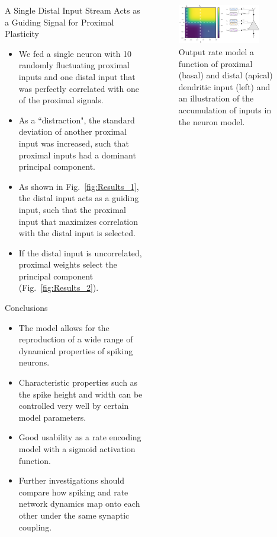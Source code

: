 \documentclass{beamer}
\begin{document}
\begin{frame}[t]
\begin{columns}[t]
\begin{column}{.4\textwidth}
\begin{myblock}{A Single Distal Input Stream Acts as a Guiding Signal for Proximal Plasticity}
\begin{itemize}
\item We fed a single neuron with 10 randomly fluctuating proximal inputs and one distal input that was perfectly correlated with one of the proximal signals. 
\item As a ``distraction", the standard deviation of another proximal input was increased, such that proximal inputs had a dominant principal component.
\item As shown in Fig.~\ref{fig:Results_1}, the distal input acts as a guiding input, such that the proximal input that maximizes correlation with the distal input is selected.
\item If the distal input is uncorrelated, proximal weights select the principal component (Fig.~\ref{fig:Results_2}).
\end{itemize}
\end{myblock}

\begin{myblock}{Conclusions}
\begin{itemize}
\item The model allows for the reproduction of a wide range of dynamical properties of spiking neurons.
\item Characteristic properties such as the spike height and width can be controlled very well by certain model parameters.
\item Good usability as a rate encoding model with a sigmoid activation function.
\item Further investigations should compare how spiking and rate network dynamics map onto each other under the same synaptic coupling.
\end{itemize}
\end{myblock}

\end{column}

\begin{column}{.5\textwidth}
\begin{figure}
\includegraphics[width=0.8\textwidth]{../figures/fig1.pdf}
\caption{Output rate model a function of proximal (basal) and distal (apical) dendritic input (left) and an illustration of the accumulation of inputs in the neuron model.}
\label{fig:Model_Illustration}
\end{figure}


\end{column}
\end{columns}
\end{frame}
\end{document}
